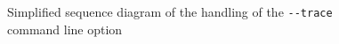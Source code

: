 \documentclass[a4paper]{article}
\begin{document}
\begin{figure}[ht]
  \centering
  \caption{Simplified sequence diagram of the handling of the \lstinline{--trace} command line option}
  \label{fig:sd_client_trace}
\end{figure}
\end{document}
